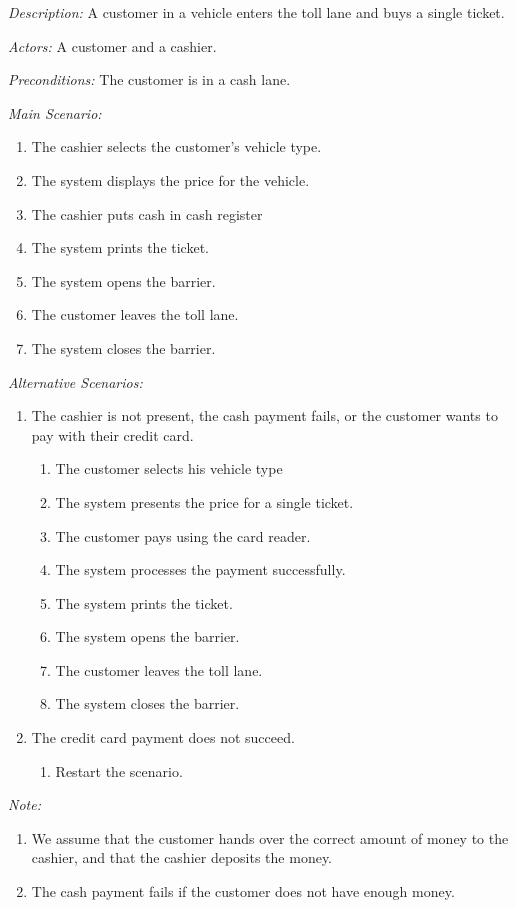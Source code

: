 
\textit {Description: } A customer in a vehicle enters the toll lane and buys a single ticket.

\textit {Actors: } A customer and a cashier.

\textit {Preconditions: }  The customer is in a cash lane.

\textit{Main Scenario: }

\begin{enumerate}
	\item The cashier selects the customer's vehicle type.
	\item The system displays the price for the vehicle.
	\item The cashier puts cash in cash register
	\item The system prints the ticket.
	\item The system opens the barrier.
	\item The customer leaves the toll lane.
	\item The system closes the barrier.
\end{enumerate}

\textit{Alternative Scenarios: }
\begin{enumerate}
	\item The cashier is not present, the cash payment fails, or the customer wants to pay with their credit card.
		\begin{enumerate}
			\item The customer selects his vehicle type
			\item The system presents the price for a single ticket.
			\item The customer pays using the card reader.
			\item The system processes the payment successfully.
			\item The system prints the ticket.
			\item The system opens the barrier.
			\item The customer leaves the toll lane.
			\item The system closes the barrier.
		\end{enumerate}
		
	\item The credit card payment does not succeed. 
		\begin{enumerate}
			\item Restart the scenario.
		\end{enumerate}

 \end{enumerate} 
 
 \textit{Note:} 
 \begin{enumerate}
 \item We assume that the customer hands over the correct amount of money to the cashier, and that the cashier deposits the money.
 \item The cash payment fails if the customer does not have enough money.
 \end{enumerate}